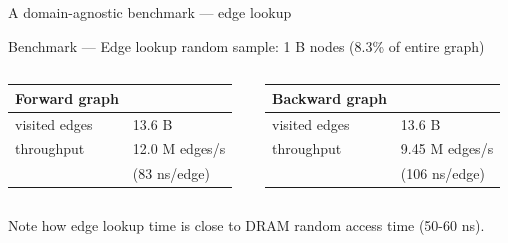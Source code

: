 \documentclass[aspectratio=169,xcolor=table]{beamer}
\begin{document}
    \begin{frame}{A domain-agnostic benchmark --- edge lookup}
        \begin{block}{Benchmark --- Edge lookup}
            random sample: 1 B nodes (8.3\% of entire graph)
            \begin{columns}\begin{column}{0.45\textwidth}
                \begin{center}
                    \begin{tabular}{ll}
                        \alert{Forward  graph} & \\
                        \hline
                        visited edges & 13.6 B\\
                        throughput & 12.0 M edges/s\\
                                   & (83 ns/edge)\\
                    \end{tabular}
                \end{center}
                \end{column}\begin{column}{0.45\textwidth}
                \begin{center}
                    \begin{tabular}{ll}
                        \alert{Backward graph} & \\
                        \hline
                        visited edges & 13.6 B\\
                        throughput & 9.45 M edges/s\\
                                   & (106 ns/edge)\\
                    \end{tabular}
                \end{center}
            \end{column}\end{columns}
        \end{block}
        Note how edge lookup time is close to DRAM random access time (50-60 ns).
    \end{frame}

\end{document}
